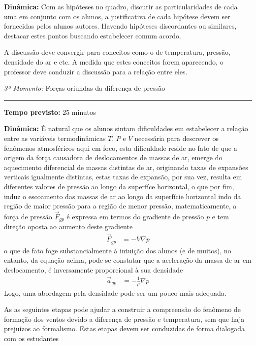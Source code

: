 \noindent\textbf{Dinâmica:} Com as hipóteses no quadro, discutir as particularidades de cada uma em conjunto com os alunos, a justificativa de cada hipótese devem ser fornecidas pelos alunos autores. Havendo hipóteses discordantes ou similares, destacar estes pontos buscando estabelecer comum acordo.

A discussão deve convergir para conceitos como o de temperatura, pressão, densidade do ar e etc. A medida que estes conceitos forem aparecendo, o professor deve conduzir a discussão para a relação entre eles. 


\vspace{50pt}
\noindent\emph{3º Momento:} Forças oriundas da diferença de pressão
\par\noindent\rule{.3\textwidth}{.5pt}
\par\noindent\textbf{Tempo previsto:} 25 minutos
\par\noindent\textbf{Dinâmica:} É natural que os alunos sintam dificuldades em estabelecer a relação entre as variáveis termodinâmicas $T$, $P$ e $V$ necessária para descrever os fenômenos atmosféricos aqui em foco, esta dificuldade reside no fato de que a origem da força causadora de deslocamentos de massas de ar, emerge do aquecimento diferencial de massas distintas de ar, originando taxas de expansões verticais igualmente distintas, estas taxas de expansão, por sua vez, resulta em diferentes valores de pressão ao longo da superfíce horizontal, o que por fim, induz o escoamento das massas de ar ao longo da superfície horizontal indo da região de maior pressão para a região de menor pressão, matematicamente, a força de pressão $\vec{F}_{gp}$ é expressa em termos do gradiente de pressão $p$ e tem direção oposta ao aumento deste gradiente
\begin{align}
	\vec{F}_{gp} &= -V\nabla p
\end{align}
o que de fato foge substancialmente à intuição dos alunos (e de muitos), no entanto, da equação acima, pode-se constatar que a aceleração da massa de ar em deslocamento, é inversamente proporcional à sua densidade
\begin{align}
	\vec{a}_{gp} &= -\frac{1}{\rho}\nabla p
\end{align}
Logo, uma abordagem pela densidade pode ser um pouco mais adequada.

As as seguintes etapas pode ajudar a construir a compreensão do fenômeno de formação dos ventos devido a diferença de pressão e temperatura, sem que haja prejuízos ao formalismo. Estas etapas devem ser conduzidas de forma dialogada com os estudantes

